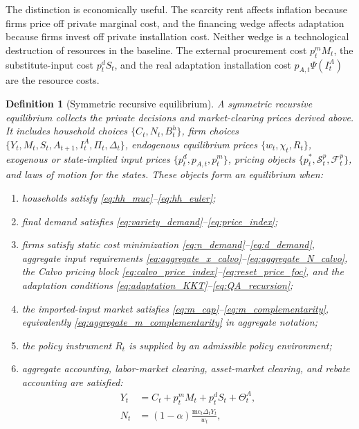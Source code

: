﻿\documentclass[12pt]{article}
\newtheorem{definition}{Definition}
\theoremstyle{remark}
\newcommand{\mc}{\mathrm{mc}}
\begin{document}
The distinction is economically useful. The scarcity rent affects inflation because firms price off
private marginal cost, and the financing wedge affects adaptation because firms invest off private
installation cost. Neither wedge is a technological destruction of resources in the baseline. The
external procurement cost $p_t^mM_t$, the substitute-input cost $p_t^dS_t$, and the real adaptation
installation cost $p_{A,t}\Psi(I_t^A)$ are the resource costs.

\begin{definition}[Symmetric recursive equilibrium]\label{def:equilibrium}
A symmetric recursive equilibrium collects the private decisions and market-clearing prices derived
above. It includes household choices $\{C_t,N_t,B_t^h\}$, firm choices
$\{Y_t,M_t,S_t,A_{t+1},I_t^A,\Pi_t,\Delta_t\}$, endogenous equilibrium prices
$\{w_t,\chi_t,R_t\}$, exogenous or state-implied input prices
$\{p_t^d,p_{A,t},p_t^m\}$, pricing objects $\{p_t^*,\mathcal S_t^p,\mathcal F_t^p\}$, and laws of
motion for the states. These objects form an equilibrium when:
\begin{enumerate}[leftmargin=1.5em]
    \item households satisfy \eqref{eq:hh_muc}--\eqref{eq:hh_euler};
    \item final demand satisfies \eqref{eq:variety_demand}--\eqref{eq:price_index};
    \item firms satisfy static cost minimization
    \eqref{eq:n_demand}--\eqref{eq:d_demand}, aggregate input requirements
    \eqref{eq:aggregate_x_calvo}--\eqref{eq:aggregate_N_calvo}, the Calvo pricing block
    \eqref{eq:calvo_price_index}--\eqref{eq:reset_price_foc}, and the adaptation conditions
    \eqref{eq:adaptation_KKT}--\eqref{eq:QA_recursion};
    \item the imported-input market satisfies
    \eqref{eq:m_cap}--\eqref{eq:m_complementarity}, equivalently
    \eqref{eq:aggregate_m_complementarity} in aggregate notation;
    \item the policy instrument $R_t$ is supplied by an admissible policy environment;
    \item aggregate accounting, labor-market clearing, asset-market clearing, and rebate accounting
    are satisfied:
    \begin{align}
        Y_t
        &=
        C_t+p_t^mM_t+p_t^dS_t+\Theta_t^A,
        \label{eq:resource_clearing}\\
        N_t
        &=
        (1-\alpha)\frac{\mc_t\Delta_tY_t}{w_t},
        \label{eq:labor_clearing}\\

\end{align}
\end{enumerate}
\end{definition}
\end{document}
